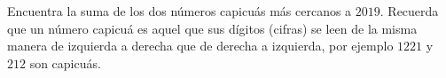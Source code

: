 Encuentra la suma de los dos números capicuás más cercanos a $2019$. Recuerda que un número capicuá es aquel que sus dígitos (cifras) se leen de la misma manera de izquierda a derecha que de derecha a izquierda, por ejemplo $1221$ y $212$ son capicuás.